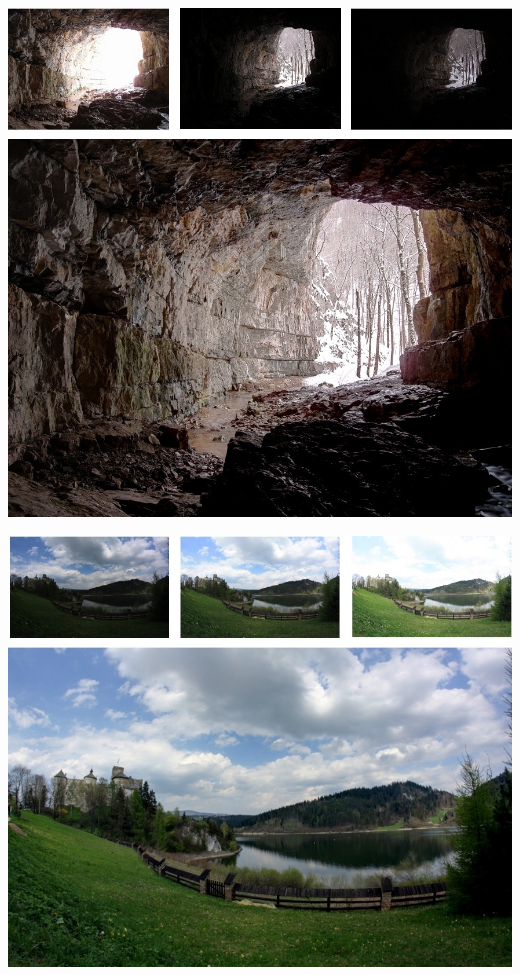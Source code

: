 \documentclass[a4paper,10pt]{article}
\begin{document}
        \includegraphics[width=\textwidth]{fused2.jpg}
        
        \includegraphics[width=\textwidth]{fused3.jpg}
        
\end{document}
